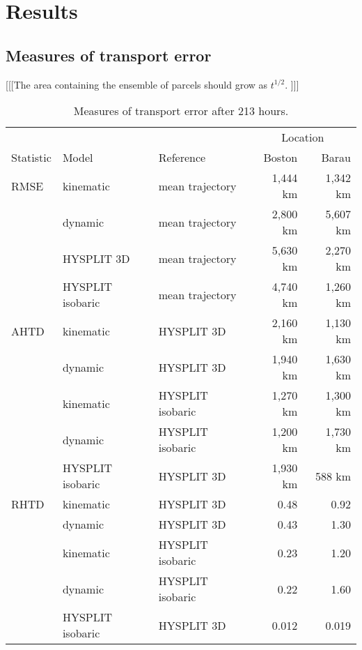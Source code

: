 \chapter{Results}

\section{Measures of transport error}

[[[The area containing the ensemble of parcels should grow as $t^{1/2}$. ]]]

\begin{table}
    \centering
    \caption{Measures of transport error after 213 hours.}    
    \begin{tabular}{ l l l r r }
        \hline
        \hline
        			&				&				& 	\multicolumn{2}{c}{Location} \\
	\cline{4-5}
        Statistic 	& Model 			& Reference 		& Boston 		& Barau		\\
        \hline
        RMSE	& kinematic 		& mean trajectory	& 1,444 km	& 1,342 km	\\
        		 	& dynamic 		& mean trajectory	& 2,800 km	& 5,607 km	\\
			& HYSPLIT 3D 		& mean trajectory	& 5,630 km	& 2,270 km	\\
        		 	& HYSPLIT isobaric 	& mean trajectory	& 4,740 km	& 1,260 km	\\
        AHTD 	& kinematic		& HYSPLIT 3D		& 2,160 km	& 1,130 km	\\
        		 	& dynamic			& HYSPLIT 3D 		& 1,940 km	& 1,630 km	\\
        		 	& kinematic		& HYSPLIT isobaric  & 1,270 km	& 1,300 km	\\
        		 	& dynamic			& HYSPLIT isobaric  & 1,200 km	& 1,730 km	\\
			& HYSPLIT isobaric	& HYSPLIT 3D 		& 1,930 km	& 588 km		\\
        RHTD 	& kinematic		& HYSPLIT 3D		& 0.48		& 0.92		\\
        		 	& dynamic			& HYSPLIT 3D 		& 0.43		& 1.30		\\
        		 	& kinematic		& HYSPLIT isobaric  & 0.23		& 1.20		\\
        		 	& dynamic			& HYSPLIT isobaric  & 0.22		& 1.60		\\
			& HYSPLIT isobaric	& HYSPLIT 3D 		& 0.012		& 0.019		\\	
        \hline
    \end{tabular}
\end{table}